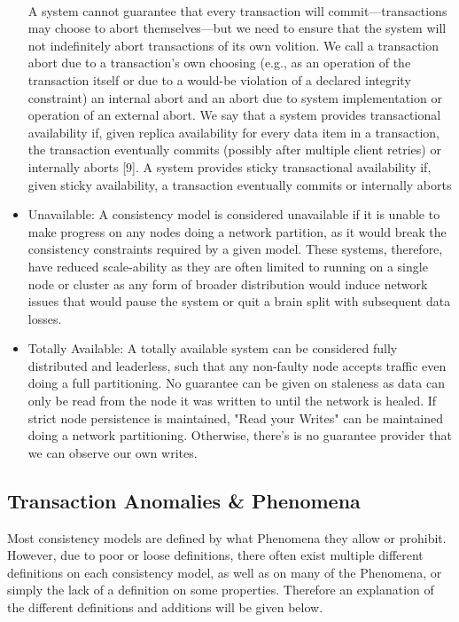 \documentclass[a4paper,10pt,titlepage]{report}
\begin{document}
\begin{itemize}
{        \vspace*{4mm}\\
        A system cannot guarantee that every transaction will commit—transactions may choose to abort themselves—but we need to ensure that the system will not indefinitely abort transactions of its own volition. We call a transaction abort due to a transaction's own choosing (e.g., as an operation of the transaction itself or due to a would-be violation of a declared integrity constraint) an internal abort and an abort due to system implementation or operation of an external abort. We say that a system provides transactional availability if, given replica availability for every data item in a transaction, the transaction eventually commits (possibly after multiple client retries) or internally aborts [9]. A system provides sticky transactional availability if, given sticky availability, a transaction eventually commits or internally aborts}\cite{HighlyAvailableTransactionsVirtuesandLimitations}

        \item Unavailable: A consistency model is considered unavailable if it is unable to make progress on any nodes doing a network partition, as it would break the consistency constraints required by a given model. These systems, therefore, have reduced scale-ability as they are often limited to running on a single node or cluster as any form of broader distribution would induce network issues that would pause the system or quit a brain split with subsequent data losses.

        \item Totally Available: A totally available system can be considered fully distributed and leaderless, such that any non-faulty node accepts traffic even doing a full partitioning. No guarantee  can be given on staleness as data can only be read from the node it was written to until the network is healed. If strict node persistence is maintained, "Read your Writes" can be maintained doing a network partitioning. Otherwise, there's is no guarantee provider that we can observe our own writes. 

    \end{itemize}

    \subsection{Transaction Anomalies \& Phenomena}
    Most consistency models are defined by what Phenomena they allow or prohibit. However, due to poor or loose definitions, there often exist multiple different definitions on each consistency model, as well as on many of the Phenomena, or simply the lack of a definition on some properties. Therefore an explanation of the different definitions and additions will be given below.\\
\end{document}
